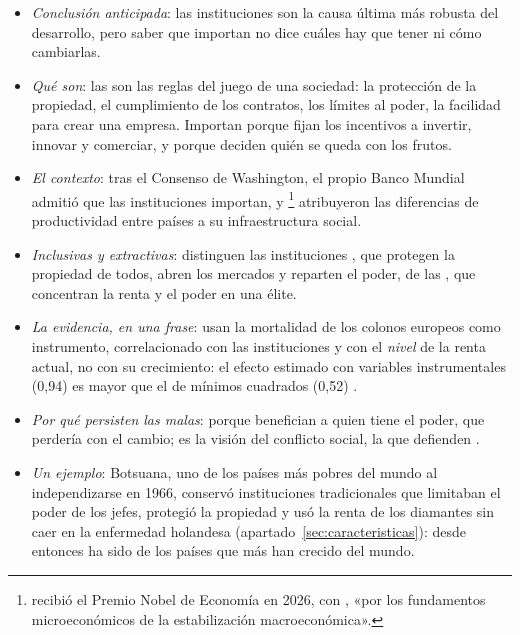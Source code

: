 \documentclass[11pt]{article}
\begin{document}
\begin{itemize}
\item \emph{Conclusión anticipada}: las instituciones son la causa última más robusta del desarrollo, pero saber que importan no dice cuáles hay que tener ni cómo cambiarlas.
\item \emph{Qué son}: las  son las reglas del juego de una sociedad\nocite{North1990}: la protección de la propiedad, el cumplimiento de los contratos, los límites al poder, la facilidad para crear una empresa. Importan porque fijan los incentivos a invertir, innovar y comerciar, y porque deciden quién se queda con los frutos.
\item \emph{El contexto}: tras el Consenso de Washington, el propio Banco Mundial admitió que las instituciones importan\nocite{BurkiPerry1998}, y \textcite{HallJones1999Why}\footnote{ recibió el Premio Nobel de Economía en 2026, con , «por los fundamentos microeconómicos de la estabilización macroeconómica»\nocite{Nobel2026Prensa}.} atribuyeron las diferencias de productividad entre países a su infraestructura social.
\item \emph{Inclusivas y extractivas}: \textcite{AcemogluRobinson2012} distinguen las instituciones , que protegen la propiedad de todos, abren los mercados y reparten el poder, de las , que concentran la renta y el poder en una élite.
\item \emph{La evidencia, en una frase}: \textcite{AcemogluJohnsonRobinson2001Colonial} usan la mortalidad de los colonos europeos como instrumento, correlacionado con las instituciones y con el \emph{nivel} de la renta actual, no con su crecimiento: el efecto estimado con variables instrumentales (0,94) es mayor que el de mínimos cuadrados (0,52) .
\item \emph{Por qué persisten las malas}: porque benefician a quien tiene el poder, que perdería con el cambio; es la visión del conflicto social, la que defienden \textcite{AcemogluJohnsonRobinson2005} .
\item \emph{Un ejemplo}: Botsuana, uno de los países más pobres del mundo al independizarse en 1966, conservó instituciones tradicionales que limitaban el poder de los jefes, protegió la propiedad y usó la renta de los diamantes sin caer en la enfermedad holandesa (apartado~\ref{sec:caracteristicas}): desde entonces ha sido de los países que más han crecido del mundo\nocite{AcemogluJohnsonRobinson2003Botswana}.

\end{itemize}
\end{document}
